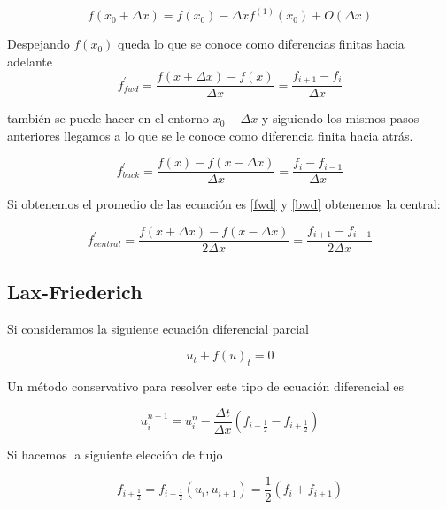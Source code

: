 \documentclass[12pt,a4paper]{book}
\begin{document}
\begin{equation}
f\left( x_0 + \Delta x \right) = f(x_0) - \Delta x f^{(1)} (x_0) + O \left( \Delta x \right)
\end{equation}

Despejando $f(x_0)$ queda lo que se conoce como diferencias finitas hacia adelante
\begin{equation}\label{fwd}
f_{fwd}^{'}=\frac{f\left(x + \Delta x \right) - f(x) }{\Delta x}=\frac{f_{i+1}-f_{i}}{\Delta x}
\end{equation}

también se puede hacer en el entorno $x_0- \Delta x$ y siguiendo los mismos pasos anteriores llegamos a lo que se le conoce como diferencia finita hacia atrás.


\begin{equation}\label{bwd}
f_{back}^{'}=\frac{f\left(x \right) - f(x - \Delta x) }{\Delta x}=\frac{f_{i}-f_{i-1}}{\Delta x}
\end{equation}

Si obtenemos el promedio de las ecuación es \ref{fwd} y \ref{bwd} obtenemos la central:

\begin{equation} \label{Centrada}
f_{central}^{'}=\frac{f\left(x + \Delta x\right) - f(x - \Delta x) }{2\Delta x}=\frac{f_{i+1}-f_{i-1}}{2 \Delta x}
\end{equation}



\subsection{Lax-Friederich}

Si consideramos la siguiente ecuación diferencial parcial

\begin{equation} \label{ecu_conser}
u_t+ f\left(u \right)_t=0
\end{equation}

Un método conservativo para resolver este tipo de ecuación diferencial es 

\begin{equation}\label{esquema conservativo}
u_i^{n+1} = u_i^{n} -\frac{\Delta t}{\Delta x} \left(f_{i-\frac{1}{2}} - f_{i+\frac{1}{2}}\right)
\end{equation}



Si hacemos la siguiente elección de flujo 

\begin{equation}
f_{i+\frac{1}{2}} = f_{i+\frac{1}{2}} \left(
u_{i} , u_{i+1}\right) =\frac{1}{2} \left(f_{i} + f_{i+1} \right) 
\end{equation}
\end{document}
